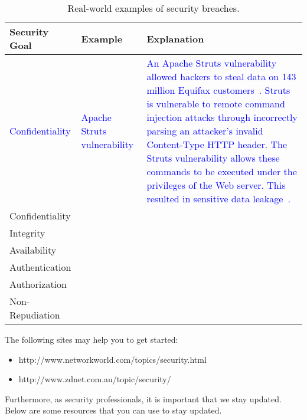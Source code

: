 \documentclass[11pt,letterpaper]{article}
\begin{document}
\begin{table}[htbp]
    \caption{Real-world examples of security breaches.
    }
    \begin{tabularx}{\columnwidth}{|p{3cm}|p{3cm}|X|}
        \hline
        \textbf{Security Goal} & \textbf{Example} & \textbf{Explanation}  \\
        
        \hline
        \textcolor{blue}{Confidentiality} & 
        \textcolor{blue}{Apache Struts vulnerability} & 
        \textcolor{blue}{An Apache Struts vulnerability allowed hackers to steal data on 143 million Equifax customers~\cite{luszcz2018apache}. Struts is vulnerable to remote command injection attacks through incorrectly parsing an attacker’s invalid Content-Type HTTP header. The Struts vulnerability allows these commands to be executed under the privileges of the Web server. This resulted in sensitive data leakage~\cite{apachestruts}.}
        \\ \hline
        
        \hline
        Confidentiality & 
        &
        \\ \hline
        
        \hline
        Integrity & 
        &
        \\ \hline
        
        \hline
        Availability & 
        &
        \\ \hline
        
        \hline
        Authentication & 
        &
        \\ \hline
        
        \hline
        Authorization & 
        &
        \\ \hline
        
        \hline
        Non-Repudiation &
        &
        \\ \hline
        
        
    \end{tabularx}
\end{table}

The following sites may help you to get started:
\begin{itemize}
    \item http://www.networkworld.com/topics/security.html
    \item http://www.zdnet.com.au/topic/security/ 
\end{itemize}

Furthermore, as security professionals, it is important that we stay updated. Below are some resources that you can use to stay updated. 
\end{document}
